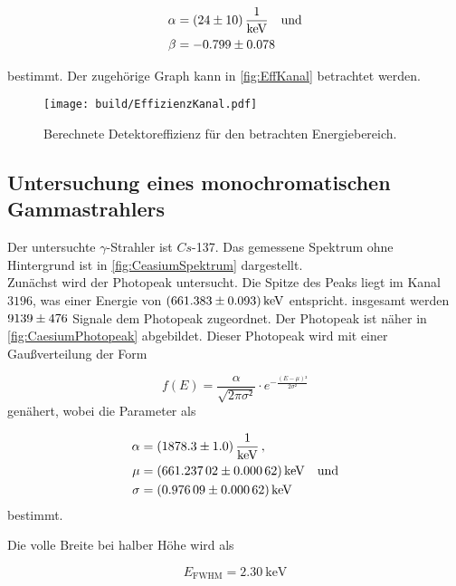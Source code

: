 \begin{align*}
    \alpha &= \SI{24 \pm 10}{\frac{1}{\kilo\eV}} \quad  \text{und} \\
    \beta  &= \num{-0.799 \pm 0.078}\\
\end{align*}
%

bestimmt.
Der zugehörige Graph kann in \autoref{fig:EffKanal} betrachtet werden.


\begin{figure}[H]
    \centering
    \texttt{[image: build/EffizienzKanal.pdf]}
    \caption{Berechnete Detektoreffizienz für den betrachten Energiebereich.}
    \label{fig:EffKanal}
\end{figure}

\subsection{Untersuchung eines monochromatischen Gammastrahlers}

Der untersuchte $\gamma$-Strahler ist $Cs$-137.
Das gemessene Spektrum ohne Hintergrund ist in \autoref{fig:CeasiumSpektrum} dargestellt.\\
Zunächst wird der Photopeak untersucht.
Die Spitze des Peaks liegt im Kanal $3196$, was einer Energie von $\SI{661.383 \pm 0.093}{\kilo\eV}$ entspricht.
insgesamt werden $\num{9139 \pm 476}$ Signale dem Photopeak zugeordnet.
Der Photopeak ist näher in \autoref{fig:CaesiumPhotopeak} abgebildet. 
Dieser Photopeak wird mit einer Gaußverteilung der Form

\begin{equation*}
    f(E) = \frac{\alpha}{\sqrt{2 \pi \sigma²}} \cdot e^{-\frac{(E-\mu)²}{2 \sigma²}}
\end{equation*}
genähert, wobei die Parameter als 

\begin{align*}
    \alpha  &= \SI{1878.3 \pm 1.0}{\frac{1}{\kilo\eV}} \,, \\
    \mu     &= \SI{661.23702 \pm 0.00062}{\kilo\eV}   \quad  \text{und}             \\
    \sigma  &= \SI{0.97609 \pm 0.00062}{\kilo\eV}\\
\end{align*}
bestimmt.

Die volle Breite bei halber Höhe wird als

\begin{equation*}
    E_{\text{FWHM}} =  \SI{2.30}{\kilo\eV}
\end{equation*}


